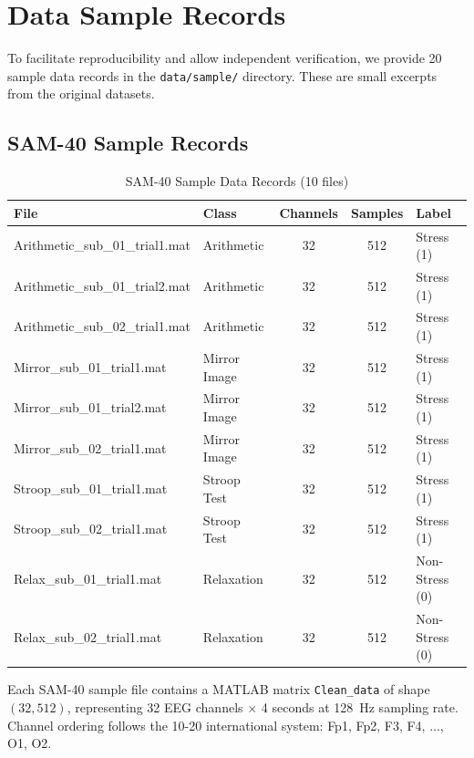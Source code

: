 \documentclass[11pt,a4paper]{article}
\begin{document}
\section{Data Sample Records}

To facilitate reproducibility and allow independent verification, we provide 20 sample data records in the \texttt{data/sample/} directory. These are small excerpts from the original datasets.

\subsection{SAM-40 Sample Records}

\begin{table}[H]
\centering
\caption{SAM-40 Sample Data Records (10 files)}
\small
\begin{tabular}{llccl}
\toprule
\textbf{File} & \textbf{Class} & \textbf{Channels} & \textbf{Samples} & \textbf{Label} \\
\midrule
Arithmetic\_sub\_01\_trial1.mat & Arithmetic & 32 & 512 & Stress (1) \\
Arithmetic\_sub\_01\_trial2.mat & Arithmetic & 32 & 512 & Stress (1) \\
Arithmetic\_sub\_02\_trial1.mat & Arithmetic & 32 & 512 & Stress (1) \\
Mirror\_sub\_01\_trial1.mat & Mirror Image & 32 & 512 & Stress (1) \\
Mirror\_sub\_01\_trial2.mat & Mirror Image & 32 & 512 & Stress (1) \\
Mirror\_sub\_02\_trial1.mat & Mirror Image & 32 & 512 & Stress (1) \\
Stroop\_sub\_01\_trial1.mat & Stroop Test & 32 & 512 & Stress (1) \\
Stroop\_sub\_02\_trial1.mat & Stroop Test & 32 & 512 & Stress (1) \\
Relax\_sub\_01\_trial1.mat & Relaxation & 32 & 512 & Non-Stress (0) \\
Relax\_sub\_02\_trial1.mat & Relaxation & 32 & 512 & Non-Stress (0) \\
\bottomrule
\end{tabular}
\end{table}

\noindent Each SAM-40 sample file contains a MATLAB matrix \texttt{Clean\_data} of shape $(32, 512)$, representing 32 EEG channels $\times$ 4 seconds at 128~Hz sampling rate. Channel ordering follows the 10-20 international system: Fp1, Fp2, F3, F4, ..., O1, O2.
\end{document}
